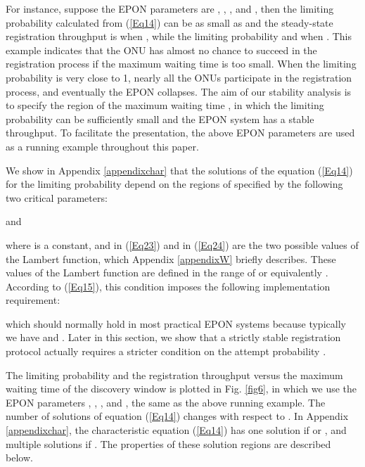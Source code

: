 \documentclass[journal]{IEEEtran}
\begin{document}
For instance, suppose the EPON parameters are , , , and , then the limiting probability  calculated from (\ref{Eq14}) can be as small as  and the steady-state registration throughput is  when , while the limiting probability  and  when . This example indicates that the ONU has almost no chance to succeed in the registration process if the maximum waiting time  is too small. When the limiting probability  is very close to 1, nearly all the ONUs participate in the registration process, and eventually the EPON collapses. The aim of our stability analysis is to specify the region of the maximum waiting time , in which the limiting probability  can be sufficiently small and the EPON system has a stable throughput. To facilitate the presentation, the above EPON parameters are used as a running example throughout this paper.

We show in Appendix \ref{appendixchar} that the solutions of the equation (\ref{Eq14}) for the limiting probability  depend on the regions of  specified by the following two critical parameters:

and

where  is a constant, and  in (\ref{Eq23}) and  in (\ref{Eq24}) are the two possible values of the Lambert  function, which Appendix \ref{appendixW} briefly describes. These values of the Lambert  function are defined in the range of  or equivalently . According to (\ref{Eq15}), this condition imposes the following implementation requirement:

which should normally hold in most practical EPON systems because typically we have  and . Later in this section, we show that a strictly stable registration protocol actually requires a stricter condition on the attempt probability .



The limiting probability  and the registration throughput  versus the maximum waiting time  of the discovery window is plotted in Fig. \ref{fig6}, in which we use the EPON parameters , , , and , the same as the above running example. The number of solutions of equation (\ref{Eq14}) changes with respect to . In Appendix \ref{appendixchar}, the characteristic equation (\ref{Eq14}) has one solution if  or , and multiple solutions if . The properties of these solution regions are described below.
\end{document}
